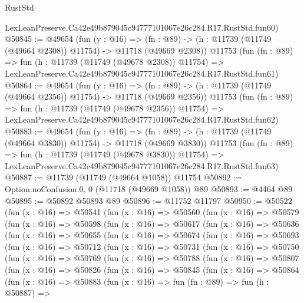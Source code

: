 \begin{lexlean}{RustStd}
\begin{coremodule}
    LexLeanPreserve.Ca42e49b879045c94777101067e26c284.R17.RustStd.fun60)
@50845 := @49654
    (fun (y : @16) =>
    (fn : @89) -> (h : @11739 (@11749 (@49664 @2308)) @11754) -> @11718 (@49669 @2308))
    @11753
    (fun (fn : @89) =>
    fun (h : @11739 (@11749 (@49678 @2308)) @11754) =>
    LexLeanPreserve.Ca42e49b879045c94777101067e26c284.R17.RustStd.fun61)
@50864 := @49654
    (fun (y : @16) =>
    (fn : @89) -> (h : @11739 (@11749 (@49664 @2356)) @11754) -> @11718 (@49669 @2356))
    @11753
    (fun (fn : @89) =>
    fun (h : @11739 (@11749 (@49678 @2356)) @11754) =>
    LexLeanPreserve.Ca42e49b879045c94777101067e26c284.R17.RustStd.fun62)
@50883 := @49654
    (fun (y : @16) =>
    (fn : @89) -> (h : @11739 (@11749 (@49664 @3830)) @11754) -> @11718 (@49669 @3830))
    @11753
    (fun (fn : @89) =>
    fun (h : @11739 (@11749 (@49678 @3830)) @11754) =>
    LexLeanPreserve.Ca42e49b879045c94777101067e26c284.R17.RustStd.fun63)
@50887 := @11739 (@11749 (@49664 @1058)) @11754
@50892 := Option.noConfusion.{0, 0} (@11718 (@49669 @1058)) @89
@50893 := @4464 @89
@50895 := @50892 @50893 @89
@50896 := @11752 @11797
@50950 := @50522
    (fun (x : @16) =>
    @50541
      (fun (x : @16) =>
      @50560
        (fun (x : @16) =>
        @50579
          (fun (x : @16) =>
          @50598
            (fun (x : @16) =>
            @50617
              (fun (x : @16) =>
              @50636
                (fun (x : @16) =>
                @50655
                  (fun (x : @16) =>
                  @50674
                    (fun (x : @16) =>
                    @50693
                      (fun (x : @16) =>
                      @50712
                        (fun (x : @16) =>
                        @50731
                          (fun (x : @16) =>
                          @50750
                            (fun (x : @16) =>
                            @50769
                              (fun (x : @16) =>
                              @50788
                                (fun (x : @16) =>
                                @50807
                                  (fun (x : @16) =>
                                  @50826
                                    (fun (x : @16) =>
                                    @50845
                                      (fun (x : @16) =>
                                      @50864
                                        (fun (x : @16) =>
                                        @50883
                                          (fun (x : @16) =>
                                          fun (fn : @89) =>
                                          fun (h : @50887) =>

\end{coremodule}
\end{lexlean}
